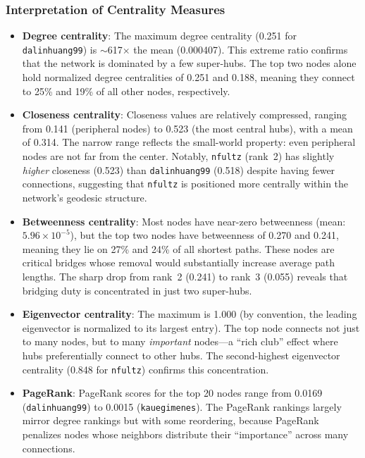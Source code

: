 \documentclass[letterpaper]{article}
\begin{document}
\subsubsection{Interpretation of Centrality Measures}

\begin{itemize}
  \item \textbf{Degree centrality}: The maximum degree centrality (0.251 for \texttt{dalinhuang99}) is $\sim$617$\times$ the mean (0.000407). This extreme ratio confirms that the network is dominated by a few super-hubs. The top two nodes alone hold normalized degree centralities of 0.251 and 0.188, meaning they connect to 25\% and 19\% of all other nodes, respectively.

  \item \textbf{Closeness centrality}: Closeness values are relatively compressed, ranging from 0.141 (peripheral nodes) to 0.523 (the most central hubs), with a mean of 0.314. The narrow range reflects the small-world property: even peripheral nodes are not far from the center. Notably, \texttt{nfultz} (rank~2) has slightly \emph{higher} closeness (0.523) than \texttt{dalinhuang99} (0.518) despite having fewer connections, suggesting that \texttt{nfultz} is positioned more centrally within the network's geodesic structure.

  \item \textbf{Betweenness centrality}: Most nodes have near-zero betweenness (mean: $5.96 \times 10^{-5}$), but the top two nodes have betweenness of 0.270 and 0.241, meaning they lie on 27\% and 24\% of all shortest paths. These nodes are critical bridges whose removal would substantially increase average path lengths. The sharp drop from rank~2 (0.241) to rank~3 (0.055) reveals that bridging duty is concentrated in just two super-hubs.

  \item \textbf{Eigenvector centrality}: The maximum is 1.000 (by convention, the leading eigenvector is normalized to its largest entry). The top node connects not just to many nodes, but to many \emph{important} nodes---a ``rich club'' effect where hubs preferentially connect to other hubs. The second-highest eigenvector centrality (0.848 for \texttt{nfultz}) confirms this concentration.

  \item \textbf{PageRank}: PageRank scores for the top 20 nodes range from 0.0169 (\texttt{dalinhuang99}) to 0.0015 (\texttt{kauegimenes}). The PageRank rankings largely mirror degree rankings but with some reordering, because PageRank penalizes nodes whose neighbors distribute their ``importance'' across many connections.
\end{itemize}
\end{document}
